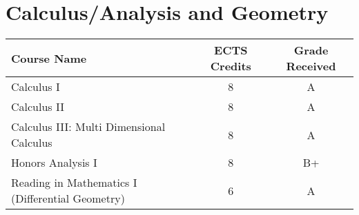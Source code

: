 \documentclass[11pt]{article}
\begin{document}
\section*{Calculus/Analysis and Geometry}

\begin{center}
\begin{tabular}{lcc}
Course Name & ECTS Credits & Grade Received \\ \toprule
Calculus I & 8 & A \\
Calculus II & 8 & A \\
Calculus III: Multi Dimensional Calculus & 8 & A \\
Honors Analysis I & 8 & B+ \\
Reading in Mathematics I (Differential Geometry) & 6 & A
\end{tabular}
\end{center}
\end{document}
